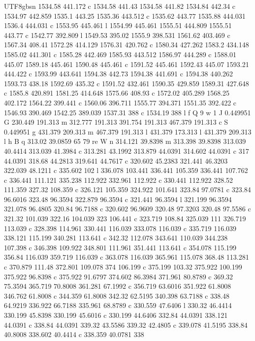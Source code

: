 \documentclass[11pt,a4paper,oneside]{report}
\begin{document}
\begin{CJK*}{UTF8}{gbsn}
{1534.58 441.172 c 1534.58 441.43 1534.58 441.82 1534.84 442.34 c 1534.97 442.859 1535.1 443.25 1535.36
443.512 c 1535.62 443.77 1535.88 444.031 1536.4 444.031 c 1553.95 445.461 l 1554.99 445.461 1555.51
444.809 1555.51 443.77 c 1542.77 392.809 l 1549.53 395.02 1555.9 398.531 1561.62 403.469 c 1567.34 408.41
1572.28 414.129 1576.31 420.762 c 1580.34 427.262 1583.2 434.148 1585.02 441.301 c 1585.28 442.469
1585.93 443.512 1586.97 444.289 c 1588.01 445.07 1589.18 445.461 1590.48 445.461 c 1591.52 445.461
1592.43 445.07 1593.21 444.422 c 1593.99 443.641 1594.38 442.73 1594.38 441.691 c 1594.38 440.262 1593.73
438.18 1592.69 435.32 c 1591.52 432.461 1590.35 429.859 1589.31 427.648 c 1585.8 420.891 1581.25 414.648
1575.66 408.93 c 1572.02 405.289 1568.25 402.172 1564.22 399.441 c 1560.06 396.711 1555.77 394.371
1551.35 392.422 c 1546.93 390.469 1542.25 389.039 1537.31 388 c 1534.19 388 l f Q 9 w 1 J 0.449951 G
230.449 191.313 m 312.777 191.313 391.754 191.313 467.379 191.313 c S 0.449951 g 431.379 209.313 m
467.379 191.313 l 431.379 173.313 l 431.379 209.313 l h B q 313.02 39.0859 65 79 re W n 314.121 39.8398 m
313.398 39.8398 313.039 40.4414 313.039 41.3984 c 313.281 43.1992 313.879 44.0391 314.602 44.0391 c 317
44.0391 318.68 44.2813 319.641 44.7617 c 320.602 45.2383 321.441 46.3203 322.039 48.1211 c 335.602 102 l
336.078 103.441 336.441 105.359 336.441 107.762 c 336.441 111.121 335.238 112.922 332.961 112.922 c
330.441 112.922 328.52 111.359 327.32 108.359 c 326.121 105.359 324.922 101.641 323.84 97.0781 c 323.84
96.6016 323.48 96.3594 322.879 96.3594 c 321.441 96.3594 l 321.199 96.3594 321.078 96.4805 320.84 96.7188
c 320.602 96.9609 320.48 97.3203 320.48 97.5586 c 321.32 101.039 322.16 104.039 323 106.441 c 323.719
108.84 325.039 111 326.719 113.039 c 328.398 114.961 330.441 116.039 333.078 116.039 c 335.719 116.039
338.121 115.199 340.281 113.641 c 342.32 112.078 343.641 110.039 344.238 107.398 c 346.398 109.922
348.801 111.961 351.441 113.641 c 354.078 115.199 356.84 116.039 359.719 116.039 c 363.078 116.039
365.961 115.078 368.48 113.281 c 370.879 111.48 372.801 109.078 374 106.199 c 375.199 103.32 375.922
100.199 375.922 96.8398 c 375.922 91.6797 374.602 86.3984 371.961 80.8789 c 369.32 75.3594 365.719
70.8008 361.281 67.1992 c 356.719 63.6016 351.922 61.8008 346.762 61.8008 c 344.359 61.8008 342.32
62.5195 340.398 63.7188 c 338.48 64.9219 336.922 66.7188 335.961 68.8789 c 330.559 47.6406 l 330.32
46.4414 330.199 45.8398 330.199 45.6016 c 330.199 44.6406 332.84 44.0391 338.121 44.0391 c 338.84 44.0391
339.32 43.5586 339.32 42.4805 c 339.078 41.5195 338.84 40.8008 338.602 40.4414 c 338.359 40.0781 338
}
\end{CJK*}
\end{document}
